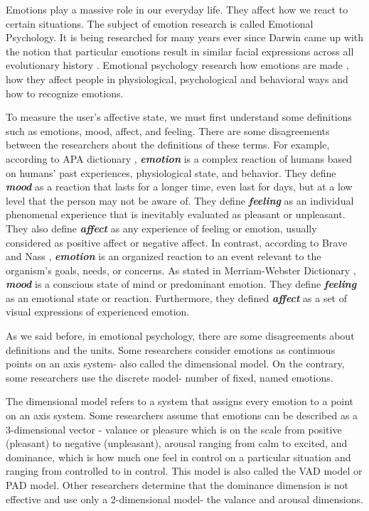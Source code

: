 \documentclass[../main.tex]{subfiles}
\begin{document}
Emotions play a massive role in our everyday life. 
They affect how we react to certain situations. 
The subject of emotion research is called Emotional Psychology. 
It is being researched for many years ever since Darwin came up with the notion that 
particular emotions result in similar facial expressions across all evolutionary history \cite{Darwin_book}. 
Emotional psychology research how emotions are made \cite{barrett2017emotions}, 
how they affect people in physiological, psychological and behavioral ways and how to recognize emotions.
\par

To measure the user's affective state, we must first understand some definitions such as
emotions, mood, affect, and feeling.
There are some disagreements between the researchers about the definitions of these terms.
For example, according to APA dictionary \cite{APA_dictionary}, 
\textbf{\emph{emotion}} is a complex reaction of humans based on humans' past experiences,
physiological state, and behavior. 
They define \textbf{\emph{mood}} as a reaction that lasts for a longer time, even last for days,
but at a low level that the person may not be aware of. 
They define \textbf{\emph{feeling}} as an individual phenomenal experience that is 
inevitably evaluated as pleasant or unpleasant. 
They also define \textbf{\emph{affect}} as any experience of feeling or emotion,
usually considered as positive affect or negative affect.
In contrast, according to Brave and Nass \cite{human_computer_interaction}, 
\textbf{\emph{emotion}} is an organized reaction to an event relevant to the organism's goals, needs, or concerns. 
As stated in Merriam-Webster Dictionary \cite{MW-Dictionary}, 
\textbf{\emph{mood}} is a conscious state of mind or predominant emotion. 
They define \textbf{\emph{feeling}} as an emotional state or reaction. 
Furthermore, they defined \textbf{\emph{affect}} as a set of visual expressions of experienced emotion.
\par


As we said before, in emotional psychology, there are some disagreements about definitions and the units.
Some researchers consider emotions as continuous points on an axis system- also called 
the dimensional model. On the contrary, some researchers use the discrete model-
number of fixed, named emotions.
\par

The dimensional model refers to a system that assigns every emotion to a point on an axis system. 
Some researchers assume that emotions can be described as a 3-dimensional vector \cite{VAD_model}- 
valance or pleasure which is on the scale from positive (pleasant) to negative (unpleasant), 
arousal ranging from calm to excited, and dominance, which is how much one feel in control on a 
particular situation and ranging from controlled to in control. This model is also called the VAD model or PAD model. 
Other researchers \cite{VA_model} determine that the dominance dimension is not effective and
use only a 2-dimensional model- the valance and arousal dimensions.
\par
\end{document}
